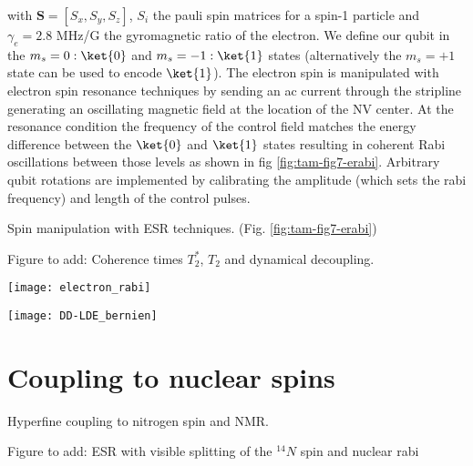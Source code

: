with $\mathbf{S} =[S_x,S_y,S_z]$,  $S_i$ the pauli spin matrices for a spin-1 particle and $\gamma_e = 2.8$ MHz/G the gyromagnetic ratio of the electron. We define our qubit in the $m_s = 0 :\ket{0}$ and $m_s = -1 : \ket{1}$ states (alternatively the $m_s = + 1$ state can be used to encode $\ket{1}$). The electron spin is manipulated with electron spin resonance techniques by sending an ac current through the stripline generating an oscillating magnetic field at the location of the NV center. At the resonance condition the frequency of the control field matches the energy difference between the $\ket{0}$ and $\ket{1}$ states resulting in coherent Rabi oscillations between those levels as shown in fig \ref{fig:tam-fig7-erabi}. Arbitrary qubit rotations are implemented by calibrating the amplitude (which sets the rabi frequency) and length of the control pulses.


Spin manipulation with ESR techniques. (Fig. \ref{fig:tam-fig7-erabi})

Figure to add: Coherence times $T_2^{*}$, $T_2$ and dynamical decoupling.

\label{sec:groundstatecontrol}
\begin{figure*}
	\centering
	\texttt{[image: electron\_rabi]}
	\caption{\label{fig:tam-fig7-erabi} \textbf{} (a) Coherent qubit rotations of the electron spin are performed by varying the length of a MW pulse. The signal is corrected to account for imperfect readout and initialization. Solid line is a sinusoidal fit from which we determine the Rabi frequency $(7.67 \pm 0.02)$ MHz}
\end{figure*}


\begin{figure*}
	\centering
	\texttt{[image: DD-LDE\_bernien]}
	\caption{\label{fig:tam-fig9-DD} \textbf{Dynamical Decoupling of the electron spin} (a) }
\end{figure*}

\section{Coupling to nuclear spins}

Hyperfine coupling to nitrogen spin and NMR.

Figure to add: ESR with visible splitting of the $^{14}N$ spin and nuclear rabi





\newpage




